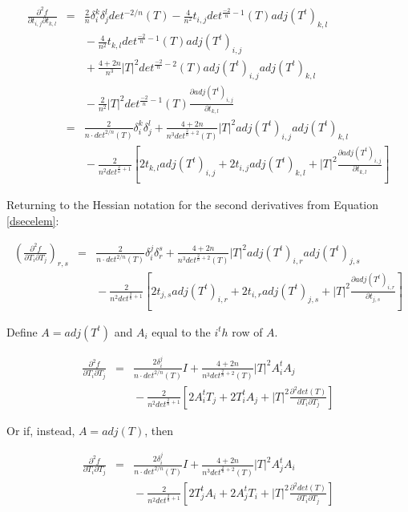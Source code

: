 \documentclass{report}
\begin{document}
\begin{eqnarray}
\nonumber
\frac{\partial^2 f}{\partial t_{i,j} \partial t_{k,l}} & = &
\frac{2}{n} \delta_i^k \delta_j^l det^{-2/n}(T) 
  - \frac{4}{n^2} t_{i,j} det^{\frac{-2}{n}-1}(T) adj(T^t)_{k,l} \\
\nonumber
  & & {} - \frac{4}{n^2}t_{k,l} det^{\frac{-2}{n} - 1}(T) adj(T^t)_{i,j} \\
\nonumber
  & & {} + \frac{4+2n}{n^3} |T|^2 det^{\frac{-2}{n} - 2}(T) adj(T^t)_{i,j} adj(T^t)_{k,l} \\
  & & {} - \frac{2}{n^2} |T|^2 det^{\frac{-2}{n} - 1}(T) \frac{\partial adj(T^t)_{i,j}}{\partial t_{k,l}} \\
 & = & \frac{2}{n \cdot det^{2/n}(T)} \delta_i^k \delta_j^l
     + \frac{4 + 2n}{n^3 det^{\frac{2}{n}+2}(T)} |T|^2 adj(T^t)_{i,j} adj(T^t)_{k,l} \\
\nonumber
& & {} - \frac{2}{n^2 det^{\frac{2}{n}+1}} \left[ 
     2 t_{k,l} adj(T^t)_{i,j} + 2 t_{i,j} adj(T^t)_{k,l}
     + |T|^2 \frac{\partial adj(T^t)_{i,j}}{\partial t_{k,l}} \right] 
\end{eqnarray}

Returning to the Hessian notation for the second derivatives from Equation \ref{dsecelem}:


\begin{eqnarray}
\left(\frac{\partial^2 f}{\partial T_i \partial T_j}\right)_{r,s} &=&
\frac{2}{n \cdot det^{2/n}(T)} \delta_i^j \delta_r^s
     + \frac{4 + 2n}{n^3 det^{\frac{2}{n}+2}(T)} |T|^2 adj(T^t)_{i,r} adj(T^t)_{j,s} \\
\nonumber
& & {} - \frac{2}{n^2 det^{\frac{2}{n}+1}} \left[ 
     2 t_{j,s} adj(T^t)_{i,r} + 2 t_{i,r} adj(T^t)_{j,s}
     + |T|^2 \frac{\partial adj(T^t)_{i,r}}{\partial t_{j,s}} \right] 
\end{eqnarray}

Define $A = adj(T^t)$ and $A_i$ equal to the $i^th$ row of $A$.

\begin{eqnarray}
\frac{\partial^2 f}{\partial T_i \partial T_j}
&=& \frac{2 \delta_i^j}{n \cdot det^{2/n}(T)} I
+ \frac{4 + 2n}{n^3 det^{\frac{2}{n}+2}(T)} |T|^2 A_i^t A_j \\ \nonumber
& & {} - \frac{2}{n^2 det^{\frac{2}{n}+1}} \left[ 
2 A_i^t T_j + 2 T_i^t A_j + |T|^2 \frac{\partial^2 det(T)}{\partial T_i \partial T_j} \right]
\end{eqnarray}

Or if, instead, $A = adj(T)$, then

\begin{eqnarray} \label{imrblockhess}
\frac{\partial^2 f}{\partial T_i \partial T_j} 
&=& \frac{2 \delta_i^j}{n \cdot det^{2/n}(T)} I
+ \frac{4 + 2n}{n^3 det^{\frac{2}{n}+2}(T)} |T|^2 A_j^t A_i \\ \nonumber
& & {} - \frac{2}{n^2 det^{\frac{2}{n}+1}} \left[ 
2 T_j^t A_i + 2 A_j^t T_i + |T|^2 \frac{\partial^2 det(T)}{\partial T_i \partial T_j} \right]
\end{eqnarray}
\end{document}
